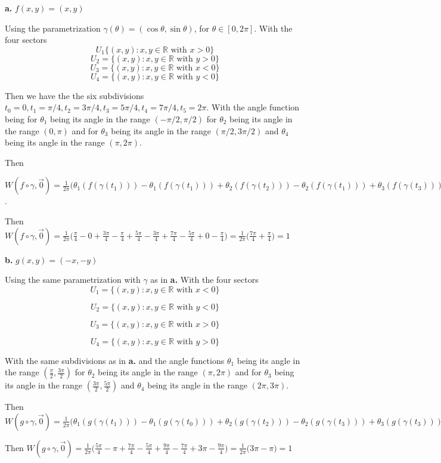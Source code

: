 \documentclass{amsart}
\theoremstyle{plain}
\theoremstyle{definition}
\theoremstyle{remark}
\begin{document}
\vspace{.1in}
{\bfseries a.}  $f(x,y) = (x,y)$
{

Using the parametrization  $\gamma(\theta)=(\cos \theta ,\sin \theta)$, for $\theta \in [0,2\pi]$. With the four sectors $$U_1\{(x,y):x,y\in \mathbb{R} \text{ with }x>0\}$$
$$U_2=\{(x,y):x,y\in \mathbb{R} \text{ with }y>0\}$$
$$U_3=\{(x,y):x,y\in \mathbb{R} \text{ with } x<0\}$$
$$U_4=\{(x,y):x,y\in \mathbb{R} \text{ with } y<0\}$$

Then we have the the six subdivisions $t_0=0,t_1=\pi/4,t_2=3\pi/4,t_3=5\pi/4,t_4=7\pi/4,t_5=2\pi$. With the angle function being for $\theta_1$ being its angle in the range $(-\pi/2,\pi/2)$ for $\theta_2$ being its angle in the range $(0,\pi)$ and for $\theta_3$ being its angle in the range $(\pi/2,3\pi/2)$ and $\theta_4$ being its angle in the range $(\pi,2\pi)$. 

Then 

$W(f\circ \gamma ,\vec 0)=\frac{1}{2\pi}\big(\theta_1(f(\gamma(t_1)))-\theta_1(f(\gamma(t_1)))+\theta_2(f(\gamma(t_2)))-\theta_2(f(\gamma(t_1)))+\theta_3(f(\gamma(t_3)))-\theta_3(f(\gamma(t_2)))+\theta_4(f(\gamma(t_4)))-\theta_4(f(\gamma(t_3)))+\theta_1(f(\gamma(t_5)))-\theta_1(f(\gamma(t_4)))\big)$. 

Then $W(f\circ \gamma ,\vec 0)=\frac{1}{2\pi}\big( \frac{\pi}{4}-0 + \frac{3\pi}{4}-\frac{\pi}{4}+\frac{5\pi}{4}-\frac{3\pi}{4}+\frac{7\pi}{4}-\frac{5\pi}{4}+0 -\frac{\pi}{4} \big)=\frac{1}{2\pi}\big(\frac{7\pi}{4}+\frac{\pi}{4}\big)=1$



}

\vspace{.1in}
{\bfseries b.} $g(x,y) = (-x,-y)$

{ 
    Using the same parametrization with $\gamma$ as in {\bfseries a.} With the four sectors 
    $$U_1=\{(x,y): x,y\in \mathbb{R} \text{ with } x<0\}$$

    $$U_2=\{(x,y): x,y\in \mathbb{R} \text{ with } y<0\}$$

    $$U_3=\{(x,y): x,y\in \mathbb{R} \text{ with } x>0\}$$

    $$U_4=\{(x,y):x,y\in \mathbb{R} \text{ with } y>0\}$$

    With the same subdivisions as in {\bfseries a.} and the angle functions $\theta_1$ being its angle in the range $(\frac{\pi}{2},\frac{3\pi}{2})$ for $\theta_2$ being its angle in the range $(\pi,2\pi)$ and for $\theta_3$ being its angle in the range $(\frac{3\pi}{2},\frac{5\pi}{2})$ and $\theta_4$ being its angle in the range $(2\pi,3\pi)$. 

    Then $W(g\circ \gamma, \vec 0)=\frac{1}{2\pi}\big(\theta_1(g (\gamma (t_1)))-\theta_1(g(\gamma (t_0)))+\theta_2(g(\gamma(t_2)))-\theta_2(g(\gamma(t_3)))+\theta_3(g(\gamma(t_3)))-\theta_3(g(\gamma(t_2))) +\theta_4(g(\gamma(t_4)))-\theta_4(g(\gamma(t_3)))+\theta_1 (g(\gamma(t_5)))-\theta_1(g(\gamma(t_4))) \big)$

    Then $W(g\circ \gamma,\vec 0)=\frac{1}{2\pi}\big( \frac{5\pi}{4} - \pi+ \frac{7\pi}{4}-\frac{5\pi}{4}+\frac{9\pi}{4}-\frac{7\pi}{4} + 3\pi - \frac{9\pi}{4}  \big)=\frac{1}{2\pi}\big( 3\pi - \pi \big)=1$
}
\end{document}
